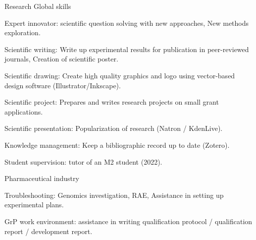 

\begin{cventries}

  \cventry
    {Research} %
    {Global skills} %
    {} %
    {} %
    {
      \begin{cvitems} %
        \item {Expert innovator: scientific question solving with new approaches, New methods exploration.}
        \item {Scientific writing: Write up experimental results for publication in peer-reviewed journals, Creation of scientific poster.}
        \item {Scientific drawing: Create high quality graphics and logo using vector-based design software (Illustrator/Inkscape).}
        \item {Scientific project: Prepares and writes research projects on small grant applications.}
        \item {Scientific presentation: Popularization of research (Natron / KdenLive).}
        \item {Knowledge management: Keep a bibliographic record up to date (Zotero).}
        \item {Student supervision: tutor of an M2 student (2022).}
      \end{cvitems}
    }
    
  \cventry
    {Pharmaceutical industry} %
    {} %
    {} %
    {} %
    {
      \begin{cvitems} %
        \item {Troubleshooting: Genomics investigation, RAE, Assistance in setting up experimental plans.}
        \item {GrP work environment: assistance in writing qualification protocol / qualification report / development report.}
      \end{cvitems}
    }



\end{cventries}
